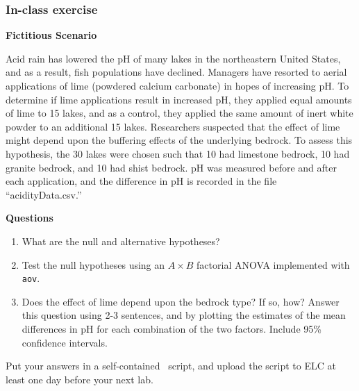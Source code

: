 \documentclass[color=usenames,dvipsnames]{beamer}\usepackage[]{graphicx}\usepackage[]{color}
\newcommand{\inr}[1]{\colorbox{inlinecolor}{\texttt{#1}}}
\begin{document}
\begin{frame}
  \frametitle{In-class exercise}
\scriptsize %

{\bf Fictitious Scenario \par}
Acid rain has lowered the pH of many
lakes in the northeastern United States, and as a result, fish
populations have declined. Managers have resorted to aerial
applications of lime (powdered calcium carbonate) in hopes of
increasing pH. To determine if lime applications result in increased
pH, they applied equal amounts of lime to 15 lakes, and as a control,
they applied the same amount of inert white powder to an additional 15
lakes. Researchers suspected that the effect of lime might depend upon
the buffering effects of the underlying bedrock. To assess this
hypothesis, the 30 lakes were chosen such that 10 had limestone
bedrock, 10 had granite bedrock, and 10 had shist bedrock. pH was
measured before and after each application, and the difference in pH
is recorded in the file ``acidityData.csv.'' \par
\pause
\vfill
{\bf Questions}
\begin{enumerate}[{\bf 1}]
  \item What are the null and alternative hypotheses?
  \item Test the null hypotheses using an $A \times B$ factorial ANOVA
    implemented with \inr{aov}. %
  \item Does the effect of lime depend upon the bedrock type? If so,
    how? Answer this question using 2-3 sentences, and by plotting the
    estimates of the mean differences in pH for each combination of
    the two factors. Include 95\% confidence intervals.
\end{enumerate}
\pause
\vfill
Put your answers in a self-contained \R~script, and upload the script
to ELC at least one day before your next lab.
\end{frame}
\end{document}
